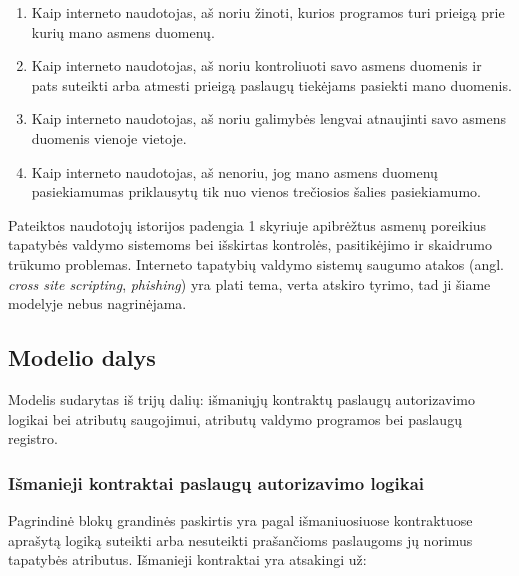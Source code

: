 \begin{enumerate}
    \item Kaip interneto naudotojas, aš noriu žinoti, kurios programos turi prieigą prie kurių mano asmens duomenų.
    \item Kaip interneto naudotojas, aš noriu kontroliuoti savo asmens duomenis ir pats suteikti arba atmesti prieigą paslaugų tiekėjams pasiekti mano duomenis.
    \item Kaip interneto naudotojas, aš noriu galimybės lengvai atnaujinti savo asmens duomenis vienoje vietoje.
    \item Kaip interneto naudotojas, aš nenoriu, jog mano asmens duomenų pasiekiamumas priklausytų tik nuo vienos trečiosios šalies pasiekiamumo.
\end{enumerate}

Pateiktos naudotojų istorijos padengia 1 skyriuje apibrėžtus asmenų poreikius tapatybės valdymo
sistemoms bei išskirtas kontrolės, pasitikėjimo ir skaidrumo trūkumo problemas. Interneto tapatybių valdymo sistemų saugumo atakos (angl.
\textit{cross site scripting}, \textit{phishing}) yra plati tema, verta atskiro tyrimo, tad ji šiame modelyje nebus nagrinėjama.

\subsection{Modelio dalys}

Modelis sudarytas iš trijų dalių: išmaniųjų kontraktų paslaugų autorizavimo logikai bei atributų saugojimui,
atributų valdymo programos bei paslaugų registro.

\subsubsection{Išmanieji kontraktai paslaugų autorizavimo logikai} \label{BCIDM:blockchainFunctions}

Pagrindinė blokų grandinės paskirtis yra pagal išmaniuosiuose kontraktuose aprašytą logiką suteikti arba nesuteikti
prašančioms paslaugoms jų norimus tapatybės atributus. Išmanieji kontraktai yra atsakingi už:

